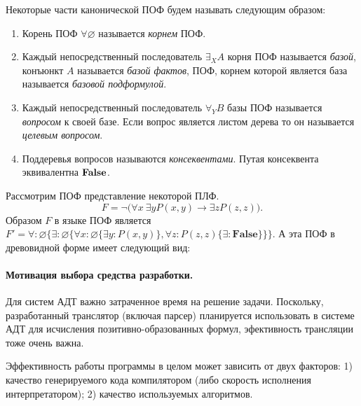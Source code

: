 \documentclass[a4paper]{jctart15b}
\begin{document}
Некоторые части канонической ПОФ будем называть следующим образом:
\begin{enumerate}
\item Корень ПОФ $\forall \varnothing$ называется {\em корнем} ПОФ.
\item Каждый непосредственный последователь $\exists_XA$ корня ПОФ называется {\em базой}, конъюнкт $A$ называется {\em базой фактов}, ПОФ, корнем которой является база называется {\em базовой подформулой}.
\item Каждый непосредственный последователь $\forall_YB$ базы ПОФ называется {\em вопросом} к своей базе. Если вопрос является листом дерева то он называется {\em целевым вопросом}.
\item Поддеревья вопросов называются {\em консеквентами}. Путая консеквента эквивалентна $\text{\textbf{False}}$.
\end{enumerate}

\begin{example}
Рассмотрим ПОФ представление некоторой ПЛФ.
$$F= \neg\bigl(\forall x\:\exists y P(x,y)\rightarrow \exists z P(z,z)\bigr).$$
Образом $F$ в языке ПОФ является $F' = \forall\colon \varnothing\{\exists\colon\varnothing\{\forall x\colon\varnothing\{\exists y\colon P(x,y)\}, \forall z\colon P(z,z)\{\exists\colon\boldsymbol{False}\}\}\}.$
А эта ПОФ в древовидной форме имеет следующий вид:
\begin{center}
\end{center}
\end{example}

\paragraph{Мотивация выбора средства разработки.} 
Для систем АДТ важно затраченное время на решение задачи. Поскольку, разработанный транслятор (включая парсер) планируется использовать в системе АДТ для исчисления позитивно-образованных формул, эфективность трансляции тоже очень важна.

Эффективность работы программы в целом может зависить от двух факторов: 1) качество генерируемого кода компилятором (либо скорость исполнения интерпретатором); 2) качество используемых алгоритмов.
\end{document}
